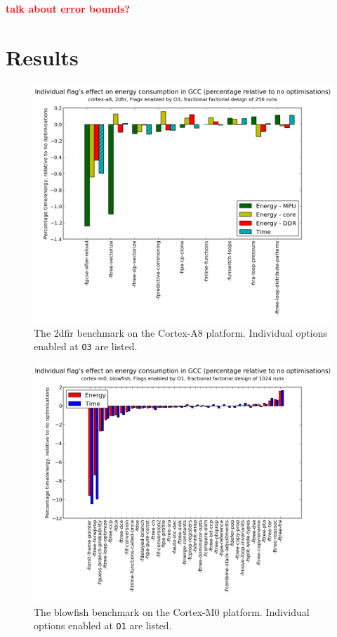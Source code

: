 \documentclass[twocolumn]{article}
\newcommand{\todo}[1]{\textbf{\textcolor{red}{#1}}}
\begin{document}
\todo{talk about error bounds?}


\section*{Results}

\begin{figure}[tb]
	\includegraphics[width=\linewidth]{cortex-a8/O3_main_effects_2dfir.png}
	\caption{The 2dfir benchmark on the Cortex-A8 platform. Individual options enabled at \texttt{O3} are listed.}
	\label{Fig:O3_2dfir_A8}
\end{figure}


\begin{figure}[tb]
	\includegraphics[width=\linewidth]{cortex-m0/O1_main_effects_blowfish.png}
	\caption{The blowfish benchmark on the Cortex-M0 platform. Individual options enabled at \texttt{O1} are listed.}
	\label{Fig:BlowfishMainEffects}
\end{figure}
\end{document}
